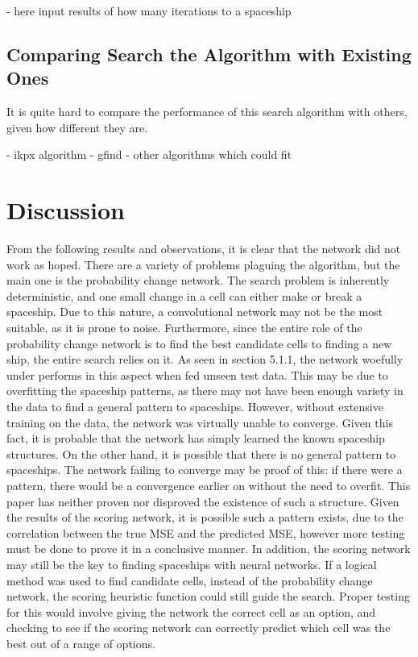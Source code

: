 \documentclass{l4proj}
\begin{document}
- here input results of how many iterations to a spaceship


\subsection{Comparing Search the Algorithm with Existing Ones}

It is quite hard to compare the performance of this search algorithm with others, given how different they are. 

- ikpx algorithm
- gfind
- other algorithms which could fit

\section{Discussion}

From the following results and observations, it is clear that the network did not work as hoped. There are a variety of problems plaguing the algorithm, but the main one is the probability change network. The search problem is inherently deterministic, and one small change in a cell can either make or break a spaceship. Due to this nature, a convolutional network may not be the most suitable, as it is prone to noise. Furthermore, since the entire role of the probability change network is to find the best candidate cells to finding a new ship, the entire search relies on it. As seen in section 5.1.1, the network woefully under performs in this aspect when fed unseen test data. This may be due to overfitting the spaceship patterns, as there may not have been enough variety in the data to find a general pattern to spaceships. However, without extensive training on the data, the network was virtually unable to converge. Given this fact, it is probable that the network has simply learned the known spaceship structures. On the other hand, it is possible that there is no general pattern to spaceships. The network failing to converge may be proof of this: if there were a pattern, there would be a convergence earlier on without the need to overfit. This paper has neither proven nor disproved the existence of such a structure. Given the results of the scoring network, it is possible such a pattern exists, due to the correlation between the true MSE and the predicted MSE, however more testing must be done to prove it in a conclusive manner. In addition, the scoring network may still be the key to finding spaceships with neural networks. If a logical method was used to find candidate cells, instead of the probability change network, the scoring heuristic function could still guide the search. Proper testing for this would involve giving the network the correct cell as an option, and checking to see if the scoring network can correctly predict which cell was the best out of a range of options.
\end{document}
